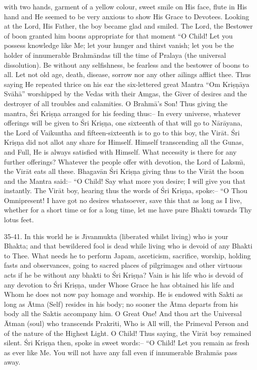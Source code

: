 with two hands, garment of a yellow colour, sweet smile on His face, flute in His hand and He seemed to be very anxious to show His Grace to Devotees. Looking at the Lord, His Father, the boy became glad and smiled. The Lord, the Bestower of boon granted him boons appropriate for that moment ``O Child! Let you possess knowledge like Me; let your hunger and thirst vanish; let you be the holder of innumerable Brahm\=andas till the time of Pralaya (the universal dissolution). Be without any selfishness, be fearless and the bestower of boons to all. Let not old age, death, disease, sorrow nor any other ailings afflict thee. Thus saying He repeated thrice on his ear the six-lettered great Mantra ``Om Kri\d{s}\d{n}\=aya Sv\=ah\=a'' worshipped by the Vedas with their Amgas, the Giver of desires and the destroyer of all troubles and calamities. O Brahm\=a's Son! Thus giving the mantra, \'Sri Kri\d{s}\d{n}a arranged for his feeding thus:-- In every universe, whatever offerings will be given to \'Sri Kri\d{s}\d{n}a, one sixteenth of that will go to N\=ar\=ayana, the Lord of Vaikuntha and fifteen-sixteenth is to go to this boy, the Vir\=at. \'Sri Kri\d{s}\d{n}a did not allot any share for Himself. Himself transcending all the Gunas, and Full, He is always satisfied with Himself. What necessity is there for any further offerings? Whatever the people offer with devotion, the Lord of Laksm\={\i}, the Vir\=at eats all these. Bhagav\=an \'Sri Kri\d{s}\d{n}a giving thus to the Vir\=at the boon and the Mantra said:-- ``O Child! Say what more you desire; I will give you that instantly. The Vir\=at boy, hearing thus the words of \'Sri Kri\d{s}\d{n}a, spoke:-- ``O Thou Omnipresent! I have got no desires whatsoever, save this that as long as I live, whether for a short time or for a long time, let me have pure Bhakti towards Thy lotus feet.

35-41. In this world he is J\={\i}vanmukta (liberated whilst living) who is your Bhakta; and that bewildered fool is dead while living who is devoid of any Bhakti to Thee. What needs he to perform Japam, asceticism, sacrifice, worship, holding fasts and observances, going to sacred places of pilgrimages and other virtuous acts if he be without any bhakti to \'Sri Kri\d{s}\d{n}a? Vain is his life who is devoid of any devotion to \'Sri Kri\d{s}\d{n}a, under Whose Grace he has obtained his life and Whom he does not now pay homage and worship. He is endowed with Sakti as long as \=Atma (Self) resides in his body; no sooner the \=Atma departs from his body all the Saktis accompany him. O Great One! And thou art the Universal \=Atman (soul) who transcends Prakriti, Who is All will, the Primeval Person and of the nature of the Highest Light. O Child! Thus saying, the Vir\=at boy remained silent. \'Sri Kri\d{s}\d{n}a then, spoke in sweet words:-- ``O Child! Let you remain as fresh as ever like Me. You will not have any fall even if innumerable Brahm\=as pass away.

